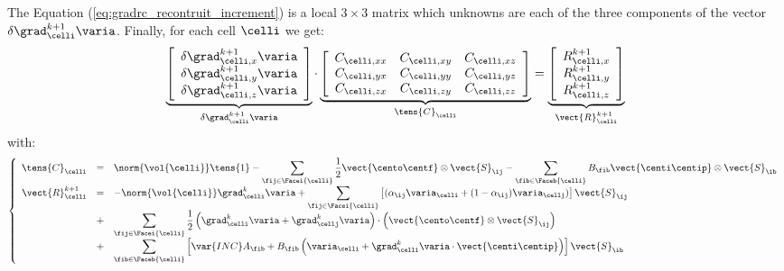 The Equation (\ref{eq:gradrc_recontruit_increment}) is a local $3 \times 3$ matrix which unknowns are each of the three components of 
the vector $\delta \grad_\celli^{k+1} \varia$. Finally, for each cell $\celli$ we get:
%
\begin{equation}\label{eq:eq_systeme_matriciel_gradrc}
\underbrace{
\left[\begin{array}{c}
\delta \grad_{\celli ,x}^{k+1} \varia\\
\delta \grad_{\celli ,y}^{k+1} \varia\\ 
\delta \grad_{\celli ,z}^{k+1} \varia
\end{array}\right]
}_{\delta \grad_\celli^{k+1} \varia }
\cdot
\underbrace{
\left[\begin{array}{ccc}
\displaystyle
  C_{\celli , xx}
& C_{\celli , xy}
& C_{\celli , xz}\\
\displaystyle
  C_{\celli , yx}
& C_{\celli , yy}
& C_{\celli , yz}\\
\displaystyle
  C_{\celli , zx}
& C_{\celli , zy}
& C_{\celli , zz}
\end{array}\right]
}_{\tens{C}_{\celli}}
=
\underbrace{
\left[\begin{array}{c}
\displaystyle
R^{k+1}_{\celli ,x}\\
\displaystyle
R^{k+1}_{\celli ,y}\\
\displaystyle
R^{k+1}_{\celli ,z}
\end{array}\right]
}_{\vect{R}^{k+1}_{\celli}}
\end{equation}
%
with:
%
\begin{equation}\label{eq:eq_second_membre_gradrc}
\left\{\begin{array}{rcl}
\tens{C}_\celli  &=& 
\displaystyle
\norm{\vol{\celli}} \tens{1} - 
\sum\limits_{ \fij \in \Facei{\celli}} \frac{1}{2}  \vect{\cento \centf} \otimes \vect{S}_{\ij} -
\sum\limits_{ \fib \in \Faceb{\celli}} B_{\fib} \vect{\centi \centip}  \otimes \vect{S}_{\ib} \\
\vect{R}^{k+1}_{\celli} &=&
\displaystyle 
 -\norm{\vol{\celli}}  \grad_{\celli}^{k} \varia +
\sum\limits_{\fij \in \Facei{\celli}}\left[
(\alpha_{\ij} \varia_\celli + (1 - \alpha_{\ij}) \varia_\cellj)\right] \vect{S}_{\ij} \\
&+& \displaystyle
\sum\limits_{\fij \in \Facei{\celli}} \frac{1}{2} 
\left(\grad_\celli^k \varia + \grad_\cellj^k \varia \right) \cdot \left( \vect{\cento \centf} \otimes \vect{S}_{\ij} \right) \\
&+& \displaystyle 
\sum\limits_{\fib \in \Faceb{\celli}}\left[ \var{INC} A_{\fib} 
+ B_{\fib} \left( \varia_\celli + \grad_\celli^k \varia \cdot \vect{\centi \centip} \right)  \right] \vect{S}_{\ib}
\end{array}\right.
\end{equation}

